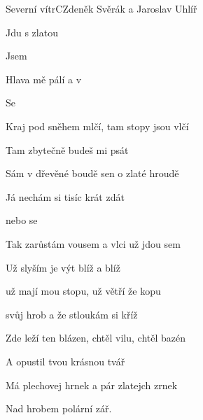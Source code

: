 \begin{song}{Severní vítr}{C}{Zdeněk Svěrák a Jaroslav Uhlíř}

\begin{SBVerse}

Jdu s  zlatou

Jsem 

Hlava mě pálí a v 

Se 

\end{SBVerse}

\begin{SBVerse}

Kraj pod sněhem mlčí, tam stopy jsou vlčí

Tam zbytečně budeš mi psát

Sám v dřevěné boudě sen o zlaté hroudě

Já nechám si tisíc krát zdát

\end{SBVerse}

\begin{SBChorus}

 

 nebo se 

\end{SBChorus}

\begin{SBVerse}

Tak zarůstám vousem a vlci už jdou sem

Už slyším je výt blíž a blíž

už mají mou stopu, už větří že kopu

svůj hrob a že stloukám si kříž

\end{SBVerse}

\begin{SBVerse}

Zde leží ten blázen, chtěl vilu, chtěl bazén

A opustil tvou krásnou tvář

Má plechovej hrnek a pár zlatejch zrnek

Nad hrobem polární zář.

\end{SBVerse}

\end{song}

\pagebreak